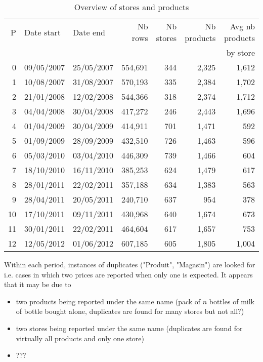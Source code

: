\documentclass[11pt]{article}
\begin{document}
\begin{table}[H]
\renewcommand{\arraystretch}{0.7}%
\caption{Overview of stores and products}
\small

\begin{tabular}{rllrrrr}
\toprule
\toprule
  P &  Date start &    Date end &  Nb rows &  Nb stores &  Nb products &  Avg nb products \\
\multicolumn{6}{c}{}&  by store \\
\midrule
  0 &  09/05/2007 &  25/05/2007 &  554,691 &        344 &        2,325 &                  1,612 \\
  1 &  10/08/2007 &  31/08/2007 &  570,193 &        335 &        2,384 &                  1,702 \\
  2 &  21/01/2008 &  12/02/2008 &  544,366 &        318 &        2,374 &                  1,712 \\
  3 &  04/04/2008 &  30/04/2008 &  417,272 &        246 &        2,443 &                  1,696 \\
  4 &  01/04/2009 &  30/04/2009 &  414,911 &        701 &        1,471 &                    592 \\
  5 &  01/09/2009 &  28/09/2009 &  432,510 &        726 &        1,463 &                    596 \\
  6 &  05/03/2010 &  03/04/2010 &  446,309 &        739 &        1,466 &                    604 \\
  7 &  18/10/2010 &  16/11/2010 &  385,253 &        624 &        1,479 &                    617 \\
  8 &  28/01/2011 &  22/02/2011 &  357,188 &        634 &        1,383 &                    563 \\
  9 &  28/04/2011 &  20/05/2011 &  240,710 &        637 &          954 &                    378 \\
 10 &  17/10/2011 &  09/11/2011 &  430,968 &        640 &        1,674 &                    673 \\
 11 &  30/01/2011 &  22/02/2011 &  464,604 &        617 &        1,657 &                    753 \\
 12 &  12/05/2012 &  01/06/2012 &  607,185 &        605 &        1,805 &                  1,004 \\
\bottomrule
\end{tabular}

\end{table}

Within each period, instances of duplicates ("Produit", "Magasin") are looked for i.e. cases in which two prices are reported when only one is expected. It appears that it may be due to
 \begin{itemize}
 \item two products being reported under the same name (pack of $n$ bottles of milk of bottle bought alone, duplicates are found for many stores but not all?)
 \item two stores being reported under the same name (duplicates are found for virtually all products and only one store)
 \item ???
\end{itemize}
\end{document}
